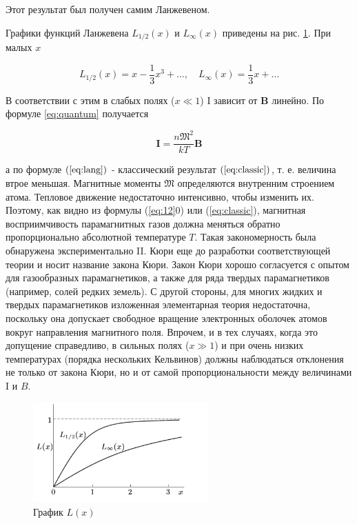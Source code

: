 \documentclass[12pt]{article}
\begin{document}
  Этот результат был получен самим Ланжевеном.

  Графики функций Ланжевена $L_{1 / 2}(x)$ и $L_{\infty}(x)$ приведены на рис. \ref{fig:175}. При малых $x$

  \begin{equation}
  L_{1 / 2}(x)=x-\frac{1}{3} x^3+\ldots, \quad L_{\infty}(x)=\frac{1}{3} x+\ldots
  \end{equation}

  В соответствии с этим в слабых полях ($x \ll 1$) I зависит от $\mathbf{B}$ линейно. По формуле \ref{eq:quantum} получается

  \begin{equation}
  \mathbf{I}=\frac{n \mathfrak{M}^2}{k T} \mathbf{B}
  \end{equation}

  а по формуле $(\ref{eq:lang})$ - классический результат $(\ref{eq:classic})$, т. е. величина втрое меньшая. Магнитные моменты $\mathfrak{M}$ определяются внутренним строением атома. Тепловое движение недостаточно интенсивно, чтобы изменить их. Поэтому, как видно из формулы (\ref{eq:12}0) или (\ref{eq:classic}), магнитная восприимчивость парамагнитных газов должна меняться обратно пропорционально абсолютной температуре $T$. Такая закономерность была обнаружена экспериментально II. Кюри еще до разработки соответствующей теории и носит название закона Кюри. Закон Кюри хорошо согласуется с опытом для газообразных парамагнетиков, а также для ряда твердых парамагнетиков (например, солей редких земель). С другой стороны, для многих жидких и твердых парамагнетиков изложенная элементарная теория недостаточна, поскольку она допускает свободное вращение электронных оболочек атомов вокруг направления магнитного поля. Впрочем, и в тех случаях, когда это
  допущение справедливо, в сильных полях ($x \gg 1$) и при очень низких температурах (порядка нескольких Кельвинов) должны наблюдаться отклонения не только от закона Кюри, но и от самой пропорциональности между величинами I и $B$.

  \begin{figure}[H]
    \centering
    \includegraphics[width=0.6\textwidth]{graph.png}
    \caption{График $L(x)$}
    \label{fig:175}
  \end{figure}
\end{document}
